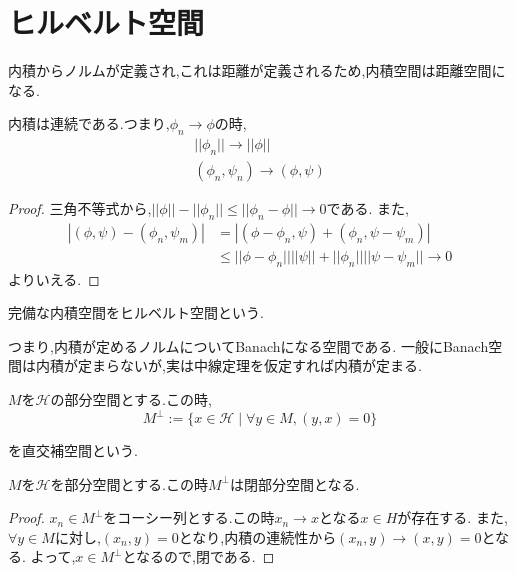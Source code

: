 \documentclass[uplatex]{jsbook}
\begin{document}
\section{ヒルベルト空間}
内積からノルムが定義され,これは距離が定義されるため,内積空間は距離空間になる.


\begin{lem}
 内積は連続である.つまり,$\phi_n \to \phi$の時,
 \begin{align*}
  ||\phi_n|| \to ||\phi||  \\
   (\phi_n, \psi_n) \to (\phi, \psi)
 \end{align*}
\end{lem}
\begin{proof}
三角不等式から,$||\phi|| - ||\phi_n|| \le ||\phi_n - \phi|| \to 0$である.
また,
\begin{align*}
|(\phi, \psi) - (\phi_n, \psi_m)| & = |(\phi - \phi_n, \psi) + (\phi_n, \psi - \psi_m)| \\
                                  & \le ||\phi - \phi_n||||\psi|| + ||\phi_n||||\psi - \psi_m|| \to 0
\end{align*}
よりいえる.
\end{proof}

\begin{screen}
\begin{dfn}
 完備な内積空間をヒルベルト空間という.
\end{dfn}
\end{screen}
つまり,内積が定めるノルムについてBanachになる空間である. 一般にBanach空間は内積が定まらないが,実は中線定理を仮定すれば内積が定まる.

\begin{screen}
\begin{dfn}
  $M$を$\mathcal{H}$の部分空間とする.この時,
  \begin{equation*}
  M^{\perp}:= \{x \in \mathcal{H} \mid \forall y \in M, (y, x) = 0\}
  \end{equation*}
\end{dfn}
を直交補空間という.
\end{screen}

\begin{lem}
 $M$を$\mathcal{H}$を部分空間とする.この時$M^{\perp}$は閉部分空間となる.
\end{lem}
\begin{proof}
  $x_n \in M^{\perp}$をコーシー列とする.この時$x_n \to x$となる$x \in H$が存在する.
  また,$\forall y \in M$に対し,$(x_n, y) =0$となり,内積の連続性から$(x_n, y) \to (x, y) =0$となる.
  よって,$x \in M^{\perp}$となるので,閉である.
\end{proof}
\end{document}
